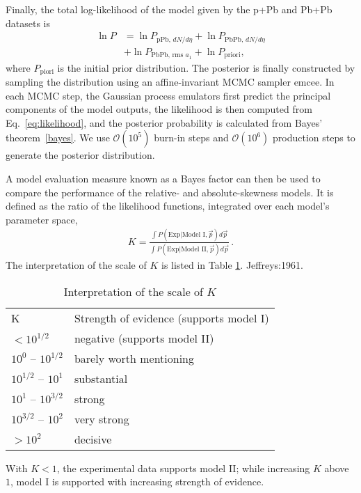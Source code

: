 Finally, the total log-likelihood of the model given by the p+Pb and Pb+Pb datasets is
\begin{align}\label{naive-formula}
\nonumber  \ln P &= \ln P_\text{pPb, $dN/d\eta$} + \ln P_\text{PbPb, $dN/d\eta$} \\
  &+  \ln P_\text{PbPb, rms $a_1$} + \ln P_{\text{priori}},
\end{align}
where $P_\text{piori}$ is the initial prior distribution.
The posterior is finally constructed by sampling the distribution using an affine-invariant MCMC sampler {emcee}.
In each MCMC step, the Gaussian process emulators first predict the principal components of the model outputs, the likelihood is then computed from Eq.~\eqref{eq:likelihood}, and the posterior probability is calculated from Bayes' theorem~\eqref{bayes}.
We use $\mathcal O(10^5)$ burn-in steps and $\mathcal O(10^6)$ production steps to generate the posterior distribution.

A model evaluation measure known as a Bayes factor can then be used to compare the performance of the relative- and absolute-skewness models.
It is defined as the ratio of the likelihood functions, integrated over each model's parameter space,
\begin{eqnarray}
	K = \frac{\int P(\textrm{Exp}|\textrm{Model I}, \vec{p}) d\vec{p}}{\int P(\textrm{Exp}|\textrm{Model II}, \vec{p}) d\vec{p}}\,.
\end{eqnarray}
The interpretation of the scale of $K$ is listed in Table \ref{tab:Kfactor}. {Jeffreys:1961}.
\begin{table}[t]
  \caption{Interpretation of the scale of $K$}
    \begin{tabular}{ll}
      K & Strength of evidence (supports model I) \\
      \paddedhline
      $ < 10^{1/2}$	& negative (supports model II)	\\
	  $10^0$ -- $10^{1/2}$	& barely worth mentioning	\\
	  $10^{1/2}$ -- $10^1$	& substantial	\\
	  $10^1$ -- $10^{3/2}$	& strong	\\
	  $10^{3/2}$ -- $10^2$	& very strong	\\
	  $>10^2$	& decisive	\\
    \end{tabular}
  \label{tab:Kfactor}
\end{table}
With $K<1$, the experimental data supports model II; while increasing $K$ above $1$, model I is supported with increasing strength of evidence.



